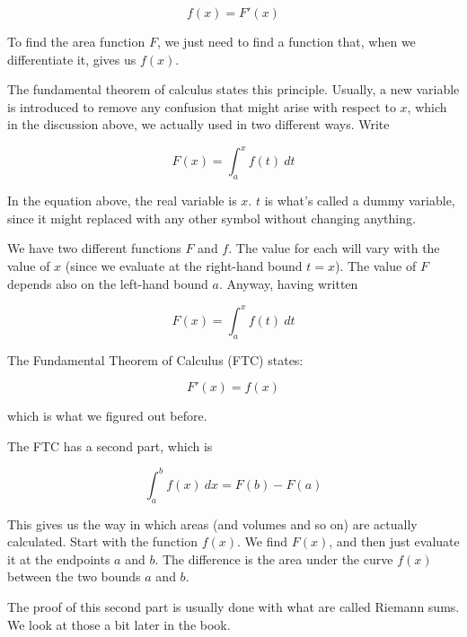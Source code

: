 \documentclass[11pt, oneside]{article}
\begin{document}
\[ f(x) = F'(x) \]

To find the area function $F$, we just need to find a function that, when we differentiate it, gives us $f(x)$.

The fundamental theorem of calculus states this principle.  Usually, a new variable is introduced to remove any confusion that might arise with respect to $x$, which in the discussion above, we actually used in two different ways.  Write

\[ F(x) = \int_a^x f(t) \ dt \]

In the equation above, the real variable is $x$.  $t$ is what's called a dummy variable, since it might replaced with any other symbol without changing anything.

We have two different functions $F$ and $f$.  The value for each will vary with the value of $x$ (since we evaluate at the right-hand bound $t=x$).  The value of $F$ depends also on the left-hand bound $a$.  Anyway, having written

\[ F(x) = \int_a^x f(t) \ dt \]

The Fundamental Theorem of Calculus (FTC) states:

\[ F'(x) = f(x) \]

which is what we figured out before.

The FTC has a second part, which is

\[ \int_a^b f(x) \ dx = F(b) - F(a) \]

This gives us the way in which areas (and volumes and so on) are actually calculated.  Start with the function $f(x)$.  We find $F(x)$, and then just evaluate it at the endpoints $a$ and $b$.  The difference is the area under the curve $f(x)$ between the two bounds $a$ and $b$.

The proof of this second part is usually done with what are called Riemann sums.  We look at those a bit later in the book.
\end{document}
